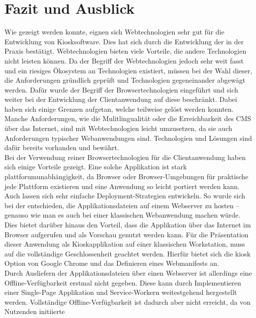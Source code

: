\chapter{Fazit und Ausblick}
\label{chap:fazit}

Wie gezeigt werden konnte, eignen sich Webtechnologien sehr gut für
die Entwicklung von Kiosksoftware. Dies hat sich durch die Entwicklung
der \shst{} in der Praxis bestätigt. Webtechnologien bieten viele Vorteile, die andere
Technologien nicht leisten können. Da der Begriff der Webtechnologien jedoch
sehr weit fasst und ein riesiges Ökosystem an Technologien existiert, müssen bei
der Wahl dieser, die Anforderungen gründlich geprüft und Technologien gegeneinander 
abgewägt werden. Dafür wurde der Begriff der Browsertechnologien eingeführt und sich
weiter bei der Entwicklung der Clientanwendung auf diese beschränkt. 
Dabei haben sich einige Grenzen aufgetan, welche teilweise gelöst werden konnten.\\
Manche Anforderungen, wie die Mulitlingualität oder die Erreichbarkeit des CMS über das Internet,
sind mit Webtechnologien leicht umzusetzen, da sie auch Anforderungen typischer Webanwendungen sind.
Technologien und Lösungen sind dafür bereits vorhanden und bewährt.\\
Bei der Verwendung reiner Browsertechnologien für die Clientanwendung haben sich einige Vorteile 
gezeigt. Eine solche Applikation ist stark plattforumunabhängigkeit, da Browser oder Browser-Umgebungen
für praktische jede Plattform existieren und eine Anwendung so leicht portiert werden kann. Auch lassen
sich sehr einfache Deployment-Strategien entwickeln. So wurde sich bei der \shst{} entschieden, die
Applikationsdateien auf einem Webserver zu hosten -- genauso wie man es auch bei einer klassischen %
Webanwendung machen würde. Dies bietet darüber hinaus den Vorteil, dass die Applikation über das Internet
im Browser aufgerufen und als Vorschau genutzt werden kann. Für die Präsentation dieser Anwendung als
Kioskapplikation auf einer klassischen Workstation, muss auf die vollständige Geschlossenheit geachtet werden.
Hierfür bietet sich die kiosk Option von Google Chrome und das Definieren eines Webmanifests an.\\
Durch Ausliefern der Applikationsdateien über einen Webserver ist allerdings eine Offline-Verfügbarkeit
erstmal nicht gegeben. Diese kann durch Implementieren einer Single-Page Applikation und 
Service-Workern weitestgehend hergestellt werden.
Vollständige Offline-Verfügbarkeit ist dadurch aber nicht erreicht, da von Nutzenden initiierte
